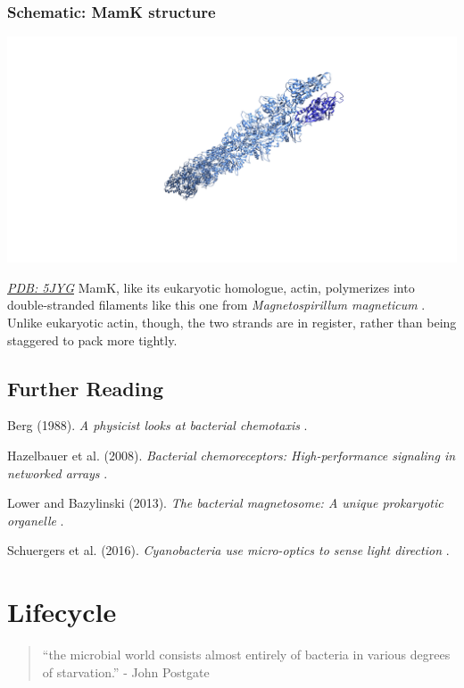 \documentclass[]{tufte-book}
\begin{document}
\hypertarget{MamK_structure}{\subsection*{Schematic: MamK
structure}\label{MamK_structure}}

\includegraphics{img/schematics/7_6_1}

\href{http://rcsb.org/structure/5JYG}{\emph{PDB: 5JYG}} MamK, like its
eukaryotic homologue, actin, polymerizes into double-stranded filaments
like this one from \emph{Magnetospirillum magneticum}
\citep{bergeron2017}. Unlike eukaryotic actin, though, the two strands
are in register, rather than being staggered to pack more tightly.

\section{Further Reading}\label{further-reading}

Berg (1988). \emph{A physicist looks at bacterial chemotaxis}
\citep{berg1988}.

Hazelbauer et al. (2008). \emph{Bacterial chemoreceptors:
High-performance signaling in networked arrays} \citep{hazelbauer2008}.

Lower and Bazylinski (2013). \emph{The bacterial magnetosome: A unique
prokaryotic organelle} \citep{lower2013}.

Schuergers et al. (2016). \emph{Cyanobacteria use micro-optics to sense
light direction} \citep{schuergers2016}.

\chapter{Lifecycle}\label{lifecycle}

\begin{quote}
``the microbial world consists almost entirely of bacteria in various
degrees of starvation.'' - John Postgate \citep{postgate1994}
\end{quote}
\end{document}
